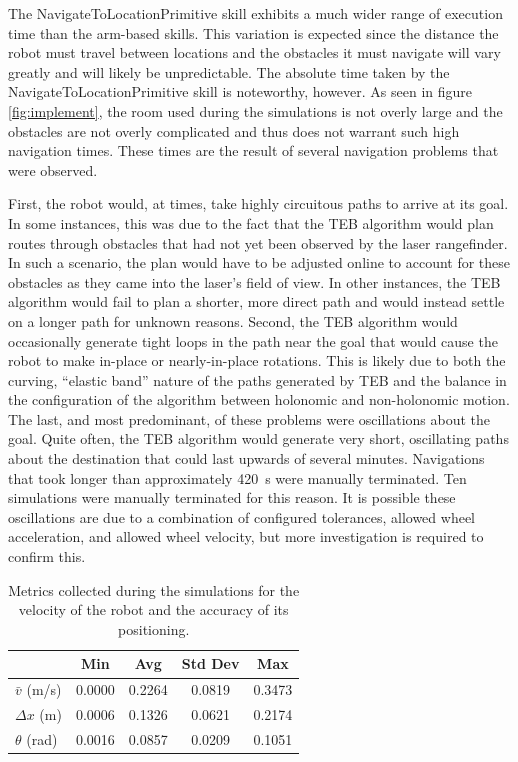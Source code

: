 The NavigateToLocationPrimitive skill exhibits a much wider range of execution time than the arm-based skills. This variation is expected since the distance the robot must travel between locations and the obstacles it must navigate will vary greatly and will likely be unpredictable. The absolute time taken by the NavigateToLocationPrimitive skill is noteworthy, however. As seen in figure \ref{fig:implement}, the room used during the simulations is not overly large and the obstacles are not overly complicated and thus does not warrant such high navigation times. These times are the result of several navigation problems that were observed.

First, the robot would, at times, take highly circuitous paths to arrive at its goal. In some instances, this was due to the fact that the TEB algorithm would plan routes through obstacles that had not yet been observed by the laser rangefinder. In such a scenario, the plan would have to be adjusted online to account for these obstacles as they came into the laser's field of view. In other instances, the TEB algorithm would fail to plan a shorter, more direct path and would instead settle on a longer path for unknown reasons. Second, the TEB algorithm would occasionally generate tight loops in the path near the goal that would cause the robot to make in-place or nearly-in-place rotations. This is likely due to both the curving, ``elastic band'' nature of the paths generated by TEB and the balance in the configuration of the algorithm between holonomic and non-holonomic motion. The last, and most predominant, of these problems were oscillations about the goal. Quite often, the TEB algorithm would generate very short, oscillating paths about the destination that could last upwards of several minutes. Navigations that took longer than approximately \SI{420}{\second} were manually terminated. Ten simulations were manually terminated for this reason. It is possible these oscillations are due to a combination of configured tolerances, allowed wheel acceleration, and allowed wheel velocity, but more investigation is required to confirm this.

\begin{table}
    \centering
    \begin{tabular}{|l|c c c c|}
        \hline
        & Min & Avg & Std Dev & Max \\
        \hline
        \hline
        $\bar{v}$ (m/s) & 0.0000 & 0.2264 & 0.0819 & 0.3473 \\
        \hline
        $\Delta x$ (m) & 0.0006 & 0.1326 & 0.0621 & 0.2174 \\
        \hline
        $\theta$ (rad) & 0.0016 & 0.0857 & 0.0209 & 0.1051 \\
        \hline
    \end{tabular}
    \caption{Metrics collected during the simulations for the velocity of the robot and the accuracy of its positioning.}
    \label{tbl:nav_metrics}
\end{table}

